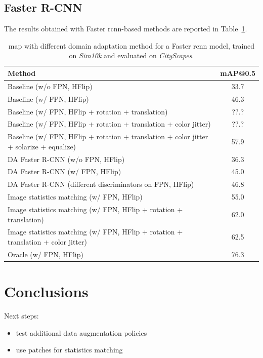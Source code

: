 \documentclass[%
    corpo=12pt,
    twoside,
    stile=classica,   
    tipotesi=magistrale,
    evenboxes,
    english
]{toptesi}
\begin{document}
\section{Faster R-CNN}
The results obtained with Faster \gls{rcnn}-based methods are reported in Table~\ref{table:fasterrcnn}.

\begin{table}[ht!]
	\centering
	\begin{tabularx}{\linewidth}{|X|c|}
		\hline
		Method  &   mAP@0.5 \\
		\hline\hline
		Baseline (w/o FPN, HFlip)       &   33.7\cite{abramov2020simple}   \\
		\hline
		Baseline (w/ FPN, HFlip)       &   46.3   \\
		\hline
		Baseline (w/ FPN, HFlip + rotation + translation)       &   ??.?   \\
		\hline
		Baseline (w/ FPN, HFlip + rotation + translation + color jitter)       &   ??.?   \\
		\hline
		Baseline (w/ FPN, HFlip + rotation + translation + color jitter + solarize + equalize)       &   57.9   \\
		\hline
		DA Faster R-CNN (w/o FPN, HFlip)    & 36.3     \\
		\hline
		DA Faster R-CNN (w/ FPN, HFlip)    & 45.0     \\
 		\hline
 		DA Faster R-CNN (different discriminators on FPN, HFlip)     &   46.8    \\
		\hline
		Image statistics matching (w/ FPN, HFlip)  &   55.0    \\
		\hline
		Image statistics matching (w/ FPN, HFlip + rotation + translation) &   62.0    \\
		\hline
		Image statistics matching (w/ FPN, HFlip + rotation + translation + color jitter) &   62.5    \\
		\hline\hline
		Oracle (w/ FPN, HFlip) &   76.3    \\
		\hline
	\end{tabularx}
	\caption{\gls{map} with different domain adaptation method for a Faster \gls{rcnn} model, trained on \textit{Sim10k} and evaluated on \textit{CityScapes}.}
	\label{table:fasterrcnn}
\end{table}

\chapter{Conclusions}
Next steps:
\begin{itemize}
	\item test additional data augmentation policies
	\item use patches for statistics matching
\end{itemize}

\backmatter
\english
\printbibliography[heading=bibintoc]

\end{document}
